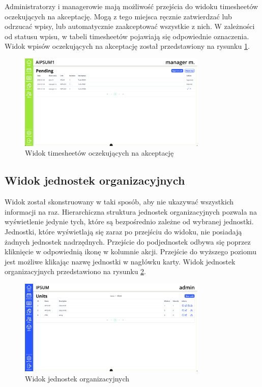 Administratorzy i managerowie mają możliwość przejścia do widoku timesheetów oczekujących na akceptację. Mogą z tego miejsca ręcznie zatwierdzać lub odrzucać wpisy, lub automatycznie zaakceptować wszystkie z nich. W zależności od statusu wpisu, w tabeli timesheetów pojawiają się odpowiednie oznaczenia. Widok wpisów oczekujących na akceptację został przedstawiony na rysunku \ref{fig:timesheetApprovalView}.

\begin{figure}[H]
    \centering
    \includegraphics[width=0.8\textwidth, frame]{graf/front/timesheetManagerPending.png}
    \caption{Widok timesheetów oczekujących na akceptację}
    \label{fig:timesheetApprovalView}
\end{figure}


\subsection{Widok jednostek organizacyjnych}

Widok został skonstruowany w taki sposób, aby nie ukazywać wszystkich informacji na raz. Hierarchiczna struktura jednostek organizacyjnych pozwala na wyświetlenie jedynie tych, które są bezpośrednio zależne od wybranej jednostki. Jednostki, które wyświetlają się zaraz po przejściu do widoku, nie posiadają żadnych jednostek nadrzędnych. Przejście do podjednostek odbywa się poprzez kliknięcie w odpowiednią ikonę w kolumnie akcji. Przejście do wyższego poziomu jest możliwe klikając nazwę jednostki w nagłówku karty. Widok jednostek organizacyjnych przedstawiono na rysunku \ref{fig:unitsView}.

\begin{figure}[H]
    \centering
    \includegraphics[width=0.8\textwidth, frame]{graf/front/units.png}
    \caption{Widok jednostek organizacyjnych}
    \label{fig:unitsView}
\end{figure}

